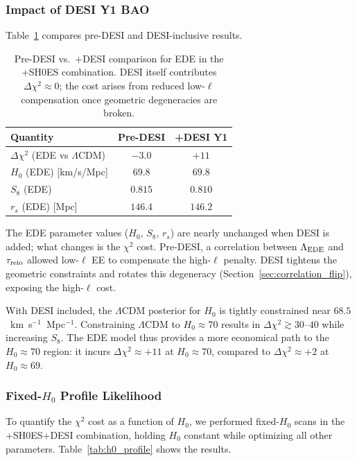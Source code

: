 \documentclass[a4paper,11pt]{article}
\begin{document}
\subsubsection{Impact of DESI Y1 BAO}
\label{sec:desi_impact}

Table~\ref{tab:desi_impact} compares pre-DESI and DESI-inclusive results.

\begin{table}[h]
\centering
\caption{Pre-DESI vs.\ +DESI comparison for EDE in the +SH0ES combination. DESI itself contributes $\Delta\chi^2 \approx 0$; the cost arises from reduced low-$\ell$ compensation once geometric degeneracies are broken.}
\label{tab:desi_impact}
\begin{tabular}{lcc}
\toprule
Quantity & Pre-DESI & +DESI Y1 \\
\midrule
$\Delta\chi^2$ (EDE vs $\Lambda$CDM) & $-3.0$ & $+11$ \\
$H_0$ (EDE) [km/s/Mpc] & $69.8$ & $69.8$ \\
$S_8$ (EDE) & $0.815$ & $0.810$ \\
$r_s$ (EDE) [Mpc] & $146.4$ & $146.2$ \\
\bottomrule
\end{tabular}
\end{table}

The EDE parameter values ($H_0$, $S_8$, $r_s$) are nearly unchanged when DESI is added; what changes is the $\chi^2$ cost. Pre-DESI, a correlation between $\Lambda_{\rm EDE}$ and $\tau_{\rm reio}$ allowed low-$\ell$ EE to compensate the high-$\ell$ penalty. DESI tightens the geometric constraints and rotates this degeneracy (Section~\ref{sec:correlation_flip}), exposing the high-$\ell$ cost.

With DESI included, the $\Lambda$CDM posterior for $H_0$ is tightly constrained near $68.5$~km~s$^{-1}$~Mpc$^{-1}$. Constraining $\Lambda$CDM to $H_0 \approx 70$ results in $\Delta\chi^2 \gtrsim 30$--$40$ while increasing $S_8$. The EDE model thus provides a more economical path to the $H_0 \approx 70$ region: it incurs $\Delta\chi^2 \approx +11$ at $H_0 \approx 70$, compared to $\Delta\chi^2 \approx +2$ at $H_0 \approx 69$.

\subsubsection{Fixed-$H_0$ Profile Likelihood}
\label{sec:h0_profile}

To quantify the $\chi^2$ cost as a function of $H_0$, we performed fixed-$H_0$ scans in the +SH0ES+DESI combination, holding $H_0$ constant while optimizing all other parameters. Table~\ref{tab:h0_profile} shows the results.
\end{document}
